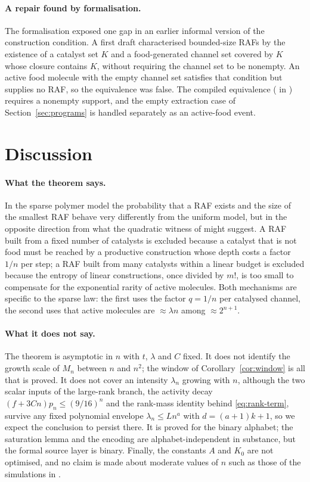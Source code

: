 \documentclass[11pt,a4paper]{article}
\theoremstyle{plain}
\theoremstyle{definition}
\theoremstyle{remark}
\begin{document}
\paragraph{A repair found by formalisation.}
The formalisation exposed one gap in an earlier informal version of the construction condition. A first draft characterised bounded-size RAFs by the existence of a catalyst set $K$ and a food-generated channel set covered by $K$ whose closure contains $K$, without requiring the channel set to be nonempty. An active food molecule with the empty channel set satisfies that condition but supplies no RAF, so the equivalence was false. The compiled equivalence ( in ) requires a nonempty support, and the empty extraction case of Section~\ref{sec:programs} is handled separately as an active-food event.

\section{Discussion}\label{sec:discussion}

\paragraph{What the theorem says.}
In the sparse polymer model the probability that a RAF exists and the size of the smallest RAF behave very differently from the uniform model, but in the opposite direction from what the quadratic witness of \cite{hordijk2016variable} might suggest. A RAF built from a fixed number of catalysts is excluded because a catalyst that is not food must be reached by a productive construction whose depth costs a factor $1/n$ per step; a RAF built from many catalysts within a linear budget is excluded because the entropy of linear constructions, once divided by $m!$, is too small to compensate for the exponential rarity of active molecules. Both mechanisms are specific to the sparse law: the first uses the factor $q=1/n$ per catalysed channel, the second uses that active molecules are $\approx\lambda n$ among $\approx2^{n+1}$.

\paragraph{What it does not say.}
The theorem is asymptotic in $n$ with $t$, $\lambda$ and $C$ fixed. It does not identify the growth scale of $M_n$ between $n$ and $n^2$; the window of Corollary~\ref{cor:window} is all that is proved. It does not cover an intensity $\lambda_n$ growing with $n$, although the two scalar inputs of the large-rank branch, the activity decay $(f+3Cn)p_n\le(9/16)^n$ and the rank-mass identity behind \eqref{eq:rank-term}, survive any fixed polynomial envelope $\lambda_n\le Ln^a$ with $d=(a+1)k+1$, so we expect the conclusion to persist there. It is proved for the binary alphabet; the saturation lemma and the encoding are alphabet-independent in substance, but the formal source layer is binary. Finally, the constants $A$ and $K_0$ are not optimised, and no claim is made about moderate values of $n$ such as those of the simulations in \cite{hordijk2016variable}.
\end{document}
